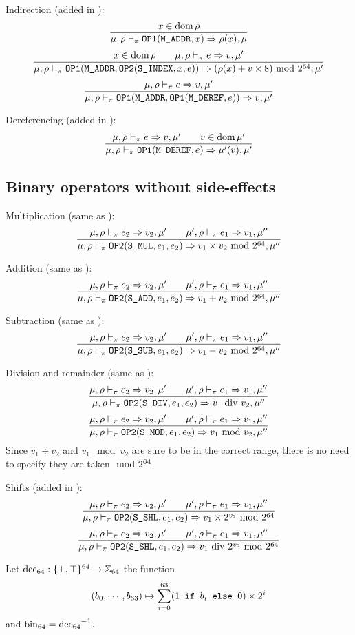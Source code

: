 Indirection (added in \Cpm):
\[\dfrac{x\in\operatorname{dom}\rho}{\mu,\rho\vdash_\pi \texttt{OP1}(\texttt{M\_ADDR}, x)\Rightarrow \rho(x),\mu}\]
\[\dfrac{x\in\operatorname{dom}\rho \qquad \mu,\rho\vdash_\pi e\Rightarrow v,\mu'}{\mu,\rho\vdash_\pi \texttt{OP1}(\texttt{M\_ADDR}, \texttt{OP2}(\texttt{S\_INDEX}, x, e)) \Rightarrow (\rho(x)+v\times 8) \text{ mod } 2^{64}, \mu'}\]
\[\dfrac{\mu,\rho\vdash_\pi e\Rightarrow v,\mu'}{\mu,\rho\vdash_\pi \texttt{OP1}(\texttt{M\_ADDR}, \texttt{OP1}(\texttt{M\_DEREF}, e)) \Rightarrow v,\mu'}\]

Dereferencing (added in \Cpm):
\[\dfrac{\mu,\rho\vdash_\pi e\Rightarrow v,\mu' \qquad v\in\operatorname{dom}\mu'}{\mu,\rho\vdash_\pi \texttt{OP1}(\texttt{M\_DEREF}, e) \Rightarrow \mu'(v),\mu'}\]

\subsection{Binary operators without side-effects}
Multiplication (same as \Cmm):
\[\dfrac{\mu,\rho\vdash_\pi e_2\Rightarrow v_2,\mu' \qquad \mu',\rho\vdash_\pi e_1\Rightarrow v_1,\mu''}{\mu,\rho\vdash_\pi \texttt{OP2}(\texttt{S\_MUL}, e_1, e_2) \Rightarrow v_1\times v_2\text{ mod } 2^{64},\mu''}\]

Addition (same as \Cmm):
\[\dfrac{\mu,\rho\vdash_\pi e_2\Rightarrow v_2,\mu' \qquad \mu',\rho\vdash_\pi e_1\Rightarrow v_1,\mu''}{\mu,\rho\vdash_\pi \texttt{OP2}(\texttt{S\_ADD}, e_1, e_2) \Rightarrow v_1 + v_2\text{ mod } 2^{64},\mu''}\]

Subtraction (same as \Cmm):
\[\dfrac{\mu,\rho\vdash_\pi e_2\Rightarrow v_2,\mu' \qquad \mu',\rho\vdash_\pi e_1\Rightarrow v_1,\mu''}{\mu,\rho\vdash_\pi \texttt{OP2}(\texttt{S\_SUB}, e_1, e_2) \Rightarrow v_1 - v_2\text{ mod } 2^{64},\mu''}\]

Division and remainder (same as \Cmm):
\[\dfrac{\mu,\rho\vdash_\pi e_2\Rightarrow v_2,\mu' \qquad \mu',\rho\vdash_\pi e_1\Rightarrow v_1,\mu''}{\mu,\rho\vdash_\pi \texttt{OP2}(\texttt{S\_DIV}, e_1, e_2) \Rightarrow v_1 \text{ div } v_2,\mu''}\]
\[\dfrac{\mu,\rho\vdash_\pi e_2\Rightarrow v_2,\mu' \qquad \mu',\rho\vdash_\pi e_1\Rightarrow v_1,\mu''}{\mu,\rho\vdash_\pi \texttt{OP2}(\texttt{S\_MOD}, e_1, e_2) \Rightarrow v_1 \text{ mod } v_2,\mu''}\]
Since \(v_1 \div v_2\) and \(v_1 \mod v_2\) are sure to be in the correct range, there is no need to specify they are taken \(\text{ mod } 2^{64}\).

Shifts (added in \Cpm):
\[\dfrac{\mu,\rho\vdash_\pi e_2\Rightarrow v_2,\mu' \qquad \mu',\rho\vdash_\pi e_1\Rightarrow v_1,\mu''}{\mu,\rho\vdash_\pi \texttt{OP2}(\texttt{S\_SHL}, e_1, e_2) \Rightarrow v_1 \times 2^{v_2} \text{ mod } 2^{64}}\]
\[\dfrac{\mu,\rho\vdash_\pi e_2\Rightarrow v_2,\mu' \qquad \mu',\rho\vdash_\pi e_1\Rightarrow v_1,\mu''}{\mu,\rho\vdash_\pi \texttt{OP2}(\texttt{S\_SHL}, e_1, e_2) \Rightarrow v_1 \text{ div } 2^{v_2} \text{ mod } 2^{64}}\]



Let \(\operatorname{dec_{64}}: \{ \bot, \top \}^{64} \to \mathbb{Z}_{64}\) the function
\[(b_0, \cdots, b_{63}) \mapsto \sum_{i=0}^{63} (1\texttt{ if } b_i\texttt{ else }0)\times 2^i\]
and \(\operatorname{bin_{64}} = \operatorname{dec_{64}}^{-1}\).


